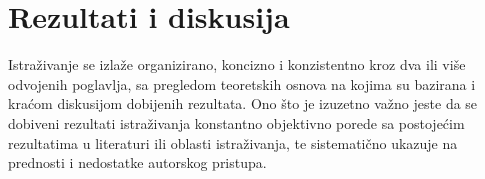 \chapter{Rezultati i diskusija}
Istraživanje se izlaže organizirano, koncizno i konzistentno kroz dva ili više odvojenih poglavlja, sa  pregledom teoretskih osnova na kojima su bazirana i kraćom diskusijom dobijenih rezultata. Ono što je izuzetno važno jeste da se dobiveni rezultati istraživanja konstantno objektivno porede sa postojećim rezultatima u literaturi ili oblasti istraživanja, te sistematično ukazuje na prednosti i nedostatke autorskog pristupa.